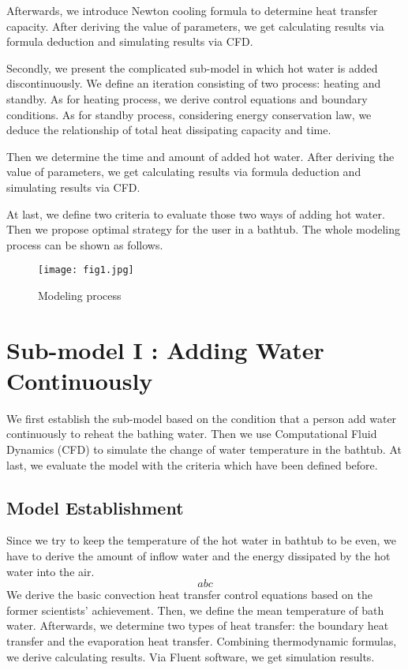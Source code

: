 \documentclass{mcmthesis}
\begin{document}
Afterwards, we introduce Newton cooling formula to determine heat transfer
capacity. After deriving the value of parameters, we get calculating results via formula deduction and simulating results via CFD.

Secondly, we present the complicated sub-model in which hot water is
added discontinuously. We define an iteration consisting of two process:
heating and standby. As for heating process, we derive control equations and boundary conditions. As for standby process, considering energy conservation law, we deduce the relationship of total heat dissipating capacity and time.

Then we determine the time and amount of added hot water. After deriving the value of parameters, we get calculating results via formula deduction and simulating results via CFD.

At last, we define two criteria to evaluate those two ways of adding hot water. Then we propose optimal strategy for the user in a bathtub.
The whole modeling process can be shown as follows.

\begin{figure}[h] 
\centering
\texttt{[image: fig1.jpg]}
\caption{Modeling process} \label{fig1}
\end{figure}

\section{Sub-model I : Adding Water Continuously}

We first establish the sub-model based on the condition that a person add water continuously to reheat the bathing water. Then we use Computational Fluid Dynamics (CFD) to simulate the change of water temperature in the bathtub. At last, we evaluate the model with the criteria which have been defined before.

\subsection{Model Establishment}

Since we try to keep the temperature of the hot water in bathtub to be even, we have to derive the amount of inflow water and the energy dissipated by the hot water into the air.
$$abc$$
We derive the basic convection heat transfer control equations based on the former scientists’ achievement. Then, we define the mean temperature of bath water. Afterwards, we determine two types of heat transfer: the boundary heat transfer and the evaporation heat transfer. Combining thermodynamic formulas, we derive calculating results. Via Fluent software, we get simulation results.
\end{document}
